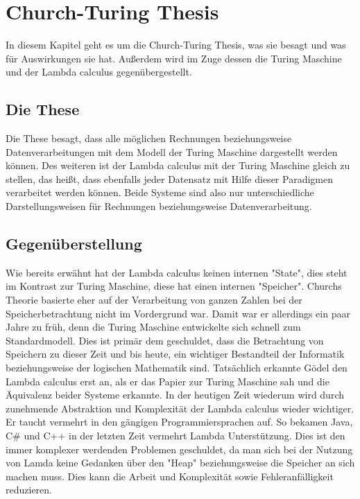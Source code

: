 \section{Church-Turing Thesis}
In diesem Kapitel geht es um die Church-Turing Thesis, was sie besagt und was für Auswirkungen sie hat. Außerdem wird im Zuge dessen die Turing Maschine und der Lambda calculus gegenübergestellt.
\subsection{Die These}
Die These besagt, dass alle möglichen Rechnungen beziehungsweise Datenverarbeitungen mit dem Modell der Turing Maschine dargestellt werden können. Des weiteren ist der Lambda calculus mit der Turing Maschine gleich zu stellen, das heißt, dass ebenfalls jeder Datensatz mit Hilfe dieser Paradigmen verarbeitet werden können. Beide Systeme sind also nur unterschiedliche Darstellungsweisen für Rechnungen beziehungsweise Datenverarbeitung.
\cite{sep-church-turing}
\subsection{Gegenüberstellung}
Wie bereits erwähnt hat der Lambda calculus keinen internen "State", dies steht im Kontrast zur Turing Maschine, diese hat einen internen "Speicher". Churchs Theorie basierte eher auf der Verarbeitung von ganzen Zahlen bei der Speicherbetrachtung nicht im Vordergrund war. Damit war er allerdings ein paar Jahre zu früh, denn die Turing Maschine entwickelte sich schnell zum Standardmodell. Dies ist primär dem geschuldet, dass die Betrachtung von Speichern zu dieser Zeit und bis heute, ein wichtiger Bestandteil der Informatik beziehungsweise der logischen Mathematik sind. Tatsächlich erkannte Gödel den Lambda calculus erst an, als er das Papier zur Turing Maschine sah und die Äquivalenz beider Systeme erkannte.\cite{sep-church-turing} In der heutigen Zeit wiederum wird durch zunehmende Abstraktion und Komplexität der Lambda calculus wieder wichtiger. Er taucht vermehrt in den gängigen Programmiersprachen auf. So bekamen Java, C\# und C++ in der letzten Zeit vermehrt Lambda Unterstützung. Dies ist den immer komplexer werdenden Problemen geschuldet, da man sich bei der Nutzung von Lamda keine Gedanken über den "Heap" beziehungsweise die Speicher an sich machen muss. Dies kann die Arbeit und Komplexität sowie Fehleranfälligkeit reduzieren.
